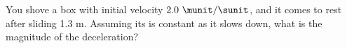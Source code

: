 %
You shove a box with initial velocity $2.0\ \munit/\sunit$, and 
it comes to rest after sliding 1.3 m. Assuming its
is constant as it slows down, what is the
magnitude of the deceleration?\answercheck

